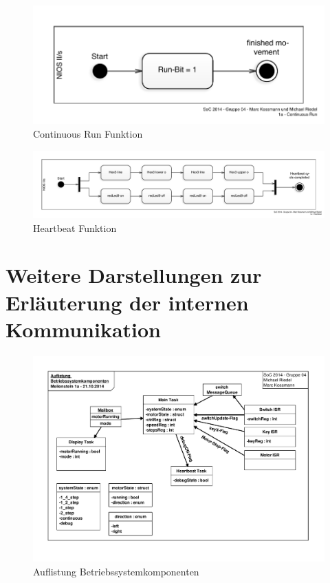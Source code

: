 \documentclass[ngerman,fontsize=12pt , paper=a4 , twoside=false , DIV12 , BCOR=1cm ,
numbers=enddot , listof=totoc , bibliography=totoc , index=totoc ,
headings=small , headlines=1.5 , final]{scrbook}
\begin{document}
\begin{figure}[htbp]
\centering
\includegraphics{../Diagrams/Activities/Functions/Continuous-Run.pdf}
\caption{Continuous Run Funktion\label{fig:continuous_run}}
\end{figure}

\begin{figure}[htbp]
\centering
\includegraphics{../Diagrams/Activities/Functions/Heartbeat.pdf}
\caption{Heartbeat Funktion\label{fig:heartbeat}}
\end{figure}

\newpage

\chapter{Weitere Darstellungen zur Erläuterung der internen
Kommunikation}\label{weitere-darstellungen-zur-erluxe4uterung-der-internen-kommunikation}

\begin{figure}[htbp]
\centering
\includegraphics{../Diagrams/Auflistung_Betriebssystemkomponenten.pdf}
\caption{Auflistung Betriebssystemkomponenten\label{fig:auflistung}}
\end{figure}
\end{document}
